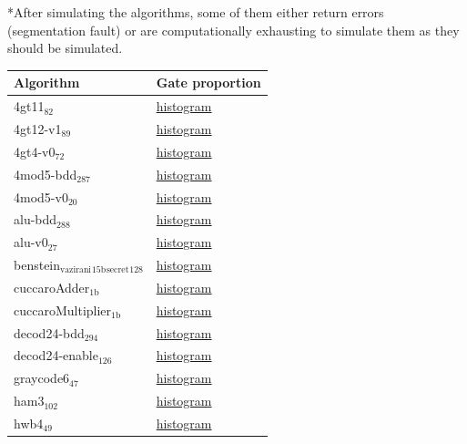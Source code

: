 *After simulating the algorithms, some of them either return errors (segmentation fault) or are computationally exhausting to simulate them as they should be simulated.
\begin{center}
\begin{tabular}{ll}
Algorithm & Gate proportion\\
\hline
4gt11\(_{\text{82}}\) & \href{post\_analysis/4gt11\_82/output\_instruction\_types.png}{histogram}\\
4gt12-v1\(_{\text{89}}\) & \href{post\_analysis/4gt12\_v1\_89/output\_instruction\_types.png}{histogram}\\
4gt4-v0\(_{\text{72}}\) & \href{post\_analysis/4gt4\_v0\_72/output\_instruction\_types.png}{histogram}\\
4mod5-bdd\(_{\text{287}}\) & \href{post\_analysis/4mod5\_bdd\_287/output\_instruction\_types.png}{histogram}\\
4mod5-v0\(_{\text{20}}\) & \href{post\_analysis/4mod5\_v0\_20/output\_instruction\_types.png}{histogram}\\
alu-bdd\(_{\text{288}}\) & \href{post\_analysis/alu\_bdd\_288/output\_instruction\_types.png}{histogram}\\
alu-v0\(_{\text{27}}\) & \href{post\_analysis/alu\_v0\_27/output\_instruction\_types.png}{histogram}\\
benstein\(_{\text{vazirani}}\)\(_{\text{15b}}\)\(_{\text{secret}}\)\(_{\text{128}}\) & \href{post\_analysis/benstein\_vazirani\_15b\_secret\_128/output\_instruction\_types.png}{histogram}\\
cuccaroAdder\(_{\text{1b}}\) & \href{post\_analysis/cuccaroAdder\_1b/output\_instruction\_types.png}{histogram}\\
cuccaroMultiplier\(_{\text{1b}}\) & \href{post\_analysis/cuccaroMultiplier\_1b/output\_instruction\_types.png}{histogram}\\
decod24-bdd\(_{\text{294}}\) & \href{post\_analysis/decod24\_bdd\_294/output\_instruction\_types.png}{histogram}\\
decod24-enable\(_{\text{126}}\) & \href{post\_analysis/decod24\_enable\_126/output\_instruction\_types.png}{histogram}\\
graycode6\(_{\text{47}}\) & \href{post\_analysis/graycode6\_47/output\_instruction\_types.png}{histogram}\\
ham3\(_{\text{102}}\) & \href{post\_analysis/ham3\_102/output\_instruction\_types.png}{histogram}\\
hwb4\(_{\text{49}}\) & \href{post\_analysis/hwb4\_49/output\_instruction\_types.png}{histogram}\\

\end{tabular}
\end{center}
